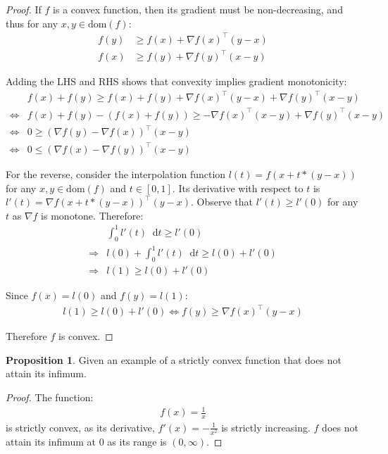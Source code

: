 \documentclass[12pt]{article}
\newcommand{\dom}{\text{dom}}
\newcommand*\diff{\mathop{}\!\mathrm{d}}
\theoremstyle{definition}
\newtheorem{prop}{Proposition}[section]
\begin{document}
	\begin{proof}
		If $f$ is a convex function, then its gradient must be non-decreasing, and thus for any $x, y \in \dom(f)$:
		\begin{align*}
			f(y) &\geq f(x) + \nabla f(x)^\top (y - x) \\
			f(x) &\geq f(y) + \nabla f(y)^\top (x - y)
		\end{align*}
		
		Adding the LHS and RHS shows that convexity implies gradient monotonicity:
		\begin{align*}
			&f(x) + f(y) \geq f(x) + f(y) + \nabla f(x)^\top (y - x) + \nabla f(y)^\top (x - y) \\
			\iff &f(x) + f(y) - (f(x) + f(y)) \geq -\nabla f(x)^\top (x - y) + \nabla f(y)^\top (x - y) \\
			\iff &0 \geq (\nabla f(y) - \nabla f(x))^\top (x - y) \\
			\iff &0 \leq (\nabla f(x) - \nabla f(y))^\top (x - y)
		\end{align*}
		
		For the reverse, consider the interpolation function $l(t) = f(x + t * (y - x))$ for any $x, y \in \dom(f)$ and $t \in [0, 1]$. Its derivative with respect to $t$ is $l'(t) = \nabla f(x + t * (y - x))^\top (y - x)$. Observe that $l'(t) \geq l'(0)$ for any $t$ as $\nabla f$ is monotone. Therefore:
		\begin{align*}
			&\int^1_0 l'(t) \diff t \geq l'(0) \\
			\Rightarrow &l(0) + \int^1_0 l'(t) \diff t \geq l(0) + l'(0) \\
			\Rightarrow &l(1) \geq l(0) + l'(0)
		\end{align*}
		
		 Since $f(x) = l(0)$ and $f(y) = l(1)$:
		 \begin{gather*}
		 	l(1) \geq l(0) + l'(0) \iff f(y) \geq \nabla f(x)^\top (y - x)
		 \end{gather*}
		 
		 Therefore $f$ is convex.
	\end{proof}
	
	\begin{prop}
		Given an example of a strictly convex function that does not  attain its infimum.
	\end{prop}
	
	\begin{proof}
		The function:
		\begin{gather*}
			f(x) = \frac{1}{x}
		\end{gather*}
		is strictly convex, as its derivative, $f'(x) = -\frac{1}{x^2}$ is strictly increasing. $f$ does not attain its infimum at $0$ as its range is $(0, \infty)$.
	\end{proof}
	
\end{document}

